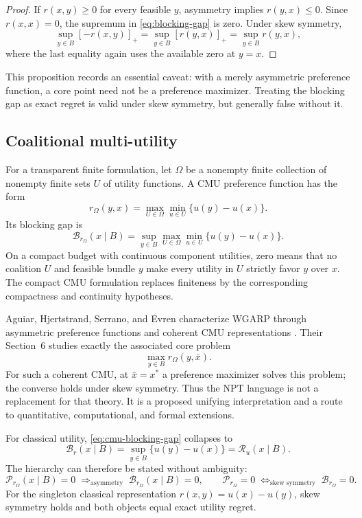 \documentclass[11pt]{article}
\newcommand{\B}{\mathcal{B}}
\newcommand{\cP}{\mathcal{P}}
\newcommand{\cR}{\mathcal{R}}
\newcommand{\pos}[1]{\left[#1\right]_{+}}
\theoremstyle{definition}
\theoremstyle{remark}
\begin{document}
\begin{proof}
If $r(x,y)\ge0$ for every feasible $y$, asymmetry implies $r(y,x)\le0$.  Since
$r(x,x)=0$, the supremum in \eqref{eq:blocking-gap} is zero.  Under skew symmetry,
\[
  \sup_{y\in B}\pos{-r(x,y)}
  =\sup_{y\in B}\pos{r(y,x)}
  =\sup_{y\in B}r(y,x),
\]
where the last equality again uses the available zero at $y=x$.
\end{proof}

This proposition records an essential caveat: with a merely asymmetric preference function,
a core point need not be a preference maximizer.  Treating the blocking gap as exact regret is
valid under skew symmetry, but generally false without it.

\subsection{Coalitional multi-utility}

For a transparent finite formulation, let $\Omega$ be a nonempty finite collection of nonempty
finite sets $U$ of utility functions.  A CMU preference function has the form
\begin{equation}
  r_\Omega(y,x)
  =\max_{U\in\Omega}\min_{u\in U}\{u(y)-u(x)\}.
  \label{eq:cmu}
\end{equation}
Its blocking gap is
\begin{equation}
  \B_{r_\Omega}(x\mid B)
  =\sup_{y\in B}\max_{U\in\Omega}
    \min_{u\in U}\{u(y)-u(x)\}.
  \label{eq:cmu-blocking-gap}
\end{equation}
On a compact budget with continuous component utilities, zero means that no coalition $U$ and
feasible bundle $y$ make every utility in $U$ strictly favor $y$ over $x$.  The compact CMU
formulation replaces finiteness by the corresponding compactness and continuity hypotheses.

Aguiar, Hjertstrand, Serrano, and Evren characterize WGARP through asymmetric preference
functions and coherent CMU representations \cite{AguiarEtAl2026}.  Their Section~6 studies
exactly the associated core problem
\[
  \max_{y\in B}r_\Omega(y,\bar x).
\]
For such a coherent CMU, at $\bar x=x^*$ a preference maximizer solves this problem; the converse holds under skew
symmetry.  Thus the NPT language is not a replacement for that theory.  It is a proposed
unifying interpretation and a route to quantitative, computational, and formal extensions.

For classical utility, \eqref{eq:cmu-blocking-gap} collapses to
\[
  \B_r(x\mid B)
  =\sup_{y\in B}\{u(y)-u(x)\}
  =\cR_u(x\mid B).
\]
The hierarchy can therefore be stated without ambiguity:
\[
  \cP_{r_\Omega}(x\mid B)=0
  \;\Longrightarrow_{\text{asymmetry}}\;
  \B_{r_\Omega}(x\mid B)=0,
  \qquad
  \cP_{r_\Omega}=0
  \;\Longleftrightarrow_{\text{skew symmetry}}\;
  \B_{r_\Omega}=0.
\]
For the singleton classical representation $r(x,y)=u(x)-u(y)$, skew symmetry holds and both
objects equal exact utility regret.
\end{document}

